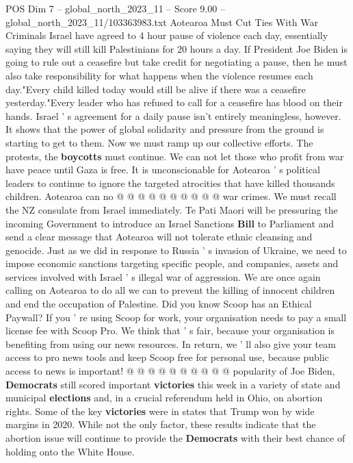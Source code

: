 \begin{textsample}{POS Dim 7 – global\_north\_2023\_11 – Score 9.00 – global\_north\_2023\_11/103363983.txt}  \label{ex:f7_pos_131}
Aotearoa Must Cut Ties With War Criminals Israel have agreed to 4 hour pause of violence each day, essentially saying they will still kill Palestinians for 20 hours a day.
If President Joe Biden is going to rule out a ceasefire but take credit for negotiating a pause, then he must also take responsibility for what happens when the violence resumes each day."Every child killed today would still be alive if there was a ceasefire yesterday."Every leader who has refused to call for a ceasefire has blood on their hands.
Israel ' s agreement for a daily pause isn't entirely meaningless, however.
It shows that the power of global solidarity and pressure from the ground is starting to get to them.
Now we must ramp up our collective efforts.
The protests, the \textbf{boycotts} must continue.
We can not let those who profit from war have peace until Gaza is free.
It is unconscionable for Aotearoa ' s political leaders to continue to ignore the targeted atrocities that have killed thousands children.
Aotearoa can no @ @ @ @ @ @ @ @ @ @ war crimes.
We must recall the NZ consulate from Israel immediately.
Te Pati Maori will be pressuring the incoming Government to introduce an Israel Sanctions \textbf{Bill} to Parliament and send a clear message that Aotearoa will not tolerate ethnic cleansing and genocide.
Just as we did in response to Russia ' s invasion of Ukraine, we need to impose economic sanctions targeting specific people, and companies, assets and services involved with Israel ' s illegal war of aggression.
We are once again calling on Aotearoa to do all we can to prevent the killing of innocent children and end the occupation of Palestine.
Did you know Scoop has an Ethical Paywall?
If you ' re using Scoop for work, your organisation needs to pay a small license fee with Scoop Pro.
We think that ' s fair, because your organisation is benefiting from using our news resources.
In return, we ' ll also give your team access to pro news tools and keep Scoop free for personal use, because public access to news is important! @ @ @ @ @ @ @ @ @ @ popularity of Joe Biden, \textbf{Democrats} still scored important \textbf{victories} this week in a variety of state and municipal \textbf{elections} and, in a crucial referendum held in Ohio, on abortion rights.
Some of the key \textbf{victories} were in states that Trump won by wide margins in 2020.
While not the only factor, these results indicate that the abortion issue will continue to provide the \textbf{Democrats} with their best chance of holding onto the White House.

\end{textsample}
